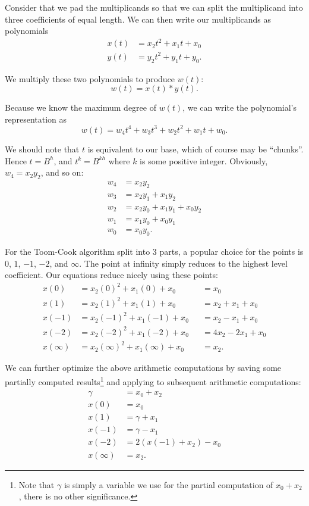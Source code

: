 \documentclass[psamsfonts,reqno]{amsart}
\theoremstyle{definition}
\theoremstyle{remark}
\numberwithin{equation}{section}
\begin{document}
Consider that we pad the multiplicands so that we can split the multiplicand into three coefficients of equal length. We can then write our multiplicands as polynomials
\begin{align*}
	x(t) &= x_2t^2 + x_1t + x_0 \\
	y(t) &= y_2t^2 + y_1t + y_0.
\end{align*}

We multiply these two polynomials to produce $w(t)$:
\begin{equation*}
	w(t)=x(t)*y(t).
\end{equation*}

Because we know the maximum degree of $w(t)$, we can write the polynomial's representation as
\begin{equation*}
	w(t) = w_4t^4 + w_3t^3 + w_2t^2 + w_1t + w_0.
\end{equation*}

We should note that $t$ is equivalent to our base, which of course may be ``chunks''. Hence $t = B^h$, and $t^k = B^{kh}$ where $k$ is some positive integer. Obviously, $w_4 = x_2y_2$, and so on:
\begin{align*}
	w_4 &= x_2y_2 \\
	w_3 &= x_2y_1 + x_1y_2 \\
	w_2 &= x_2y_0 + x_1y_1 + x_0y_2 \\
	w_1 &= x_1y_0 + x_0y_1 \\
	w_0 &= x_0y_0.
\end{align*}

For the Toom-Cook algorithm split into 3 parts, a popular choice for the points is $0$, $1$, $-1$, $-2$, and $\infty$. The point at infinity simply reduces to the highest level coefficient. Our equations reduce nicely using these points:
\begin{align*}
	x(0) &= x_2(0)^2 + x_1(0) + x_0 &&= x_0 \\
	x(1) &= x_2(1)^2 + x_1(1) + x_0	&&= x_2 + x_1 + x_0 \\
	x(-1) &= x_2(-1)^2 + x_1(-1) + x_0 &&= x_2 - x_1 + x_0 \\
	x(-2) &= x_2(-2)^2 + x_1(-2) + x_0 &&= 4x_2 - 2x_1 + x_0 \\
	x(\infty) &= x_2(\infty)^2 + x_1(\infty) + x_0 &&= x_2.
\end{align*}

We can further optimize the above arithmetic computations by saving some partially computed results\footnote{Note that $\gamma$ is simply a variable we use for the partial computation of $x_0 + x_2$, there is no other significance.} and applying to subsequent arithmetic computations:
\begin{align}
	\gamma &= x_0 + x_2 \label{toom_opt1} \\
	x(0) &= x_0 \label{toom_opt2} \\
	x(1) &= \gamma + x_1 \label{toom_opt3} \\
	x(-1) &= \gamma - x_1 \label{toom_opt4} \\
	x(-2) &= 2(x(-1) + x_2) - x_0 \label{toom_opt5} \\
	x(\infty) &= x_2. \label{toom_opt6}
\end{align}
\end{document}

